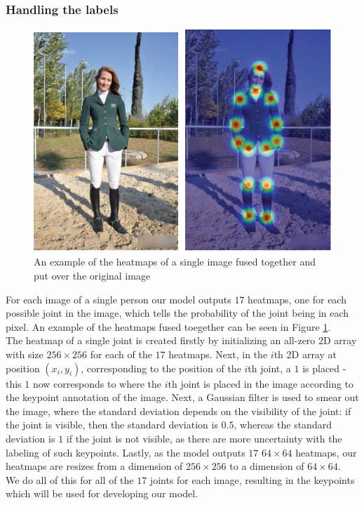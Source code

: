 \documentclass[main.tex]{subfiles}
\begin{document}
\subsubsection{Handling the labels}
\begin{figure}[H]
    \centering
    \includegraphics[height = 4 cm]{./entities/heatmaps_ex.PNG}
    \caption{An example of the heatmaps of a single image fused together and put over the original image \cite{survey_1}}
    \label{fig:heatmaps_ex}
\end{figure}
For each image of a single person our model outputs $17$ heatmaps, one for each possible joint in the image, which tells the probability of the joint being in each pixel. An example of the heatmaps fused toegether can be seen in Figure \ref{fig:heatmaps_ex}. \\
The heatmap of a single joint is created firstly by initializing an all-zero 2D array with size $256 \times 256$ for each of the $17$ heatmaps. Next, in the $i$th 2D array at position $(x_i, y_i)$, corresponding to the position of the $i$th joint, a $1$ is placed - this $1$ now corresponds to where the $i$th joint is placed in the image according to the keypoint annotation of the image. Next, a Gaussian filter is used to smear out the image, where the standard deviation depends on the visibility of the joint: if the joint is visible, then the standard deviation is $0.5$, whereas the standard deviation is $1$ if the joint is not visible, as there are more uncertainty with the labeling of such keypoints. Lastly, as the model outputs $17$ $64 \times 64$ heatmaps, our heatmaps are resizes from a dimension of $256 \times 256$ to a dimension of $64 \times 64$. \\
We do all of this for all of the $17$ joints for each image, resulting in the keypoints which will be used for developing our model.
\end{document}
